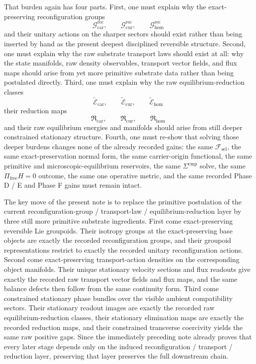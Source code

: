 \documentclass[11pt]{article}
\newcommand{\StemFunctional}{\mathscr F_{\mathrm{sel}}}
\newcommand{\TensorReconGroup}{\mathcal G_{\mathrm{car}}^{\mathrm{rec}}}
\newcommand{\CurReconGroup}{\mathcal G_{\mathrm{cur}}^{\mathrm{rec}}}
\newcommand{\HomReconGroup}{\mathcal G_{\mathrm{hom}}^{\mathrm{rec}}}
\newcommand{\TensorRawEqClass}{\widetilde{\mathscr E}_{\mathrm{car}}}
\newcommand{\CurRawEqClass}{\widetilde{\mathscr E}_{\mathrm{cur}}}
\newcommand{\HomRawEqClass}{\widetilde{\mathscr E}_{\mathrm{hom}}}
\newcommand{\TensorEqReduce}{\mathfrak R_{\mathrm{car}}}
\newcommand{\CurEqReduce}{\mathfrak R_{\mathrm{cur}}}
\newcommand{\HomEqReduce}{\mathfrak R_{\mathrm{hom}}}
\begin{document}
That burden again has four parts. First, one must explain why the exact-preserving reconfiguration groups
\[
\TensorReconGroup,\qquad
\CurReconGroup,\qquad
\HomReconGroup
\]
and their unitary actions on the sharper sectors should exist rather than being inserted by hand as the present deepest disciplined reversible structure. Second, one must explain why the raw substrate transport laws should exist at all: why the state manifolds, raw density observables, transport vector fields, and flux maps should arise from yet more primitive substrate data rather than being postulated directly. Third, one must explain why the raw equilibrium-reduction classes
\[
\TensorRawEqClass,\qquad
\CurRawEqClass,\qquad
\HomRawEqClass
\]
their reduction maps
\[
\TensorEqReduce,\qquad
\CurEqReduce,\qquad
\HomEqReduce
\]
and their raw equilibrium energies and manifolds should arise from still deeper constrained stationary structure. Fourth, one must re-show that solving those deeper burdens changes none of the already recorded gains: the same \(\StemFunctional\), the same exact-preservation normal form, the same carrier-origin functional, the same primitive and microscopic-equilibrium reservoirs, the same \(\Sigma^{\mathrm{cmp}}\) solve, the same \(\Pi_{\mathrm{free}}H=0\) outcome, the same one operative metric, and the same recorded Phase D / E and Phase F gains must remain intact.

The key move of the present note is to replace the primitive postulation of the current reconfiguration-group / transport-law / equilibrium-reduction layer by three still more primitive substrate ingredients. First come exact-preserving reversible Lie groupoids. Their isotropy groups at the exact-preserving base objects are exactly the recorded reconfiguration groups, and their groupoid representations restrict to exactly the recorded unitary reconfiguration actions. Second come exact-preserving transport-action densities on the corresponding object manifolds. Their unique stationary velocity sections and flux readouts give exactly the recorded raw transport vector fields and flux maps, and the same balance defects then follow from the same continuity form. Third come constrained stationary phase bundles over the visible ambient compatibility sectors. Their stationary readout images are exactly the recorded raw equilibrium-reduction classes, their stationary elimination maps are exactly the recorded reduction maps, and their constrained transverse coercivity yields the same raw positive gaps. Since the immediately preceding note already proves that every later stage depends only on the induced reconfiguration / transport / reduction layer, preserving that layer preserves the full downstream chain.
\end{document}
